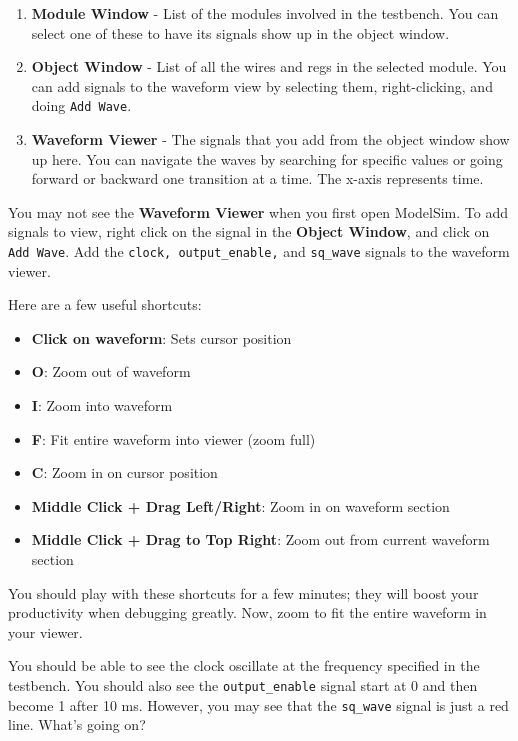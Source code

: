 \documentclass[11pt]{article}
\begin{document}
\begin{enumerate}
	\item \textbf{Module Window} - List of the modules involved in the testbench. You can select one of these to have its signals show up in the object window.
	\item \textbf{Object Window} - List of all the wires and regs in the selected module. You can add signals to the waveform view by selecting them, right-clicking, and doing \verb|Add Wave|.
	\item \textbf{Waveform Viewer} - The signals that you add from the object window show up here. You can navigate the waves by searching for specific values or going forward or backward one transition at a time. The x-axis represents time.
\end{enumerate}

You may not see the \textbf{Waveform Viewer} when you first open ModelSim. To add signals to view, right click on the signal in the \textbf{Object Window}, and click on \verb|Add Wave|. Add the \verb|clock, output_enable,| and \verb|sq_wave| signals to the waveform viewer.

Here are a few useful shortcuts:

\begin{itemize}
	\item \textbf{Click on waveform}: Sets cursor position
	\item \textbf{O}: Zoom out of waveform
	\item \textbf{I}: Zoom into waveform
	\item \textbf{F}: Fit entire waveform into viewer (zoom full)
	\item \textbf{C}: Zoom in on cursor position
	\item \textbf{Middle Click + Drag Left/Right}: Zoom in on waveform section
	\item \textbf{Middle Click + Drag to Top Right}: Zoom out from current waveform section
\end{itemize}

You should play with these shortcuts for a few minutes; they will boost your productivity when debugging greatly. Now, zoom to fit the entire waveform in your viewer.

You should be able to see the clock oscillate at the frequency specified in the testbench. You should also see the \verb|output_enable| signal start at 0 and then become 1 after 10 ms. However, you may see that the \verb|sq_wave| signal is just a red line. What's going on?
\end{document}
